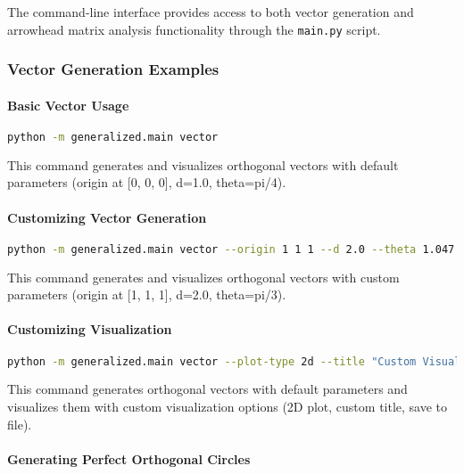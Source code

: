 The command-line interface provides access to both vector generation and arrowhead matrix analysis functionality through the \texttt{main.py} script.

\subsubsection{Vector Generation Examples}

\paragraph{Basic Vector Usage}

\begin{lstlisting}[language=bash]
python -m generalized.main vector
\end{lstlisting}

This command generates and visualizes orthogonal vectors with default parameters (origin at [0, 0, 0], d=1.0, theta=pi/4).

\paragraph{Customizing Vector Generation}

\begin{lstlisting}[language=bash]
python -m generalized.main vector --origin 1 1 1 --d 2.0 --theta 1.047
\end{lstlisting}

This command generates and visualizes orthogonal vectors with custom parameters (origin at [1, 1, 1], d=2.0, theta=pi/3).

\paragraph{Customizing Visualization}

\begin{lstlisting}[language=bash]
python -m generalized.main vector --plot-type 2d --title "Custom Visualization" --save-path custom.png
\end{lstlisting}

This command generates orthogonal vectors with default parameters and visualizes them with custom visualization options (2D plot, custom title, save to file).

\paragraph{Generating Perfect Orthogonal Circles}

